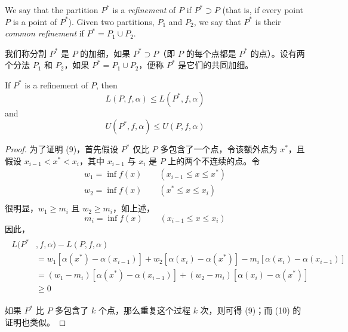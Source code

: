 \documentclass[../poma-notes.tex]{subfiles}
\begin{document}
\newpage

\begin{definition}
  We say that the partition $P^*$ is a \textit{refinement} of $P$ if $P^* \supset P$ (that is, if every point $P$ is a
  point of $P^*$). Given two partitions, $P_1$ and $P_2$, we say that $P^*$ is their \textit{common refinement} if
  $P^* = P_1 \cup P_2$.
\end{definition}

\begin{anote}
  我们称分割 $P^*$ 是 $P$ 的加细，如果 $P^* \supset P$（即 $P$ 的每个点都是 $P^*$ 的点）。设有两个分法 $P_1$ 和 $P_2$，如果
  $P^* = P_1 \cup P_2$，便称 $P^*$ 是它们的共同加细。
\end{anote}

\begin{theorem}
  If $P^*$ is a refinement of $P$, then
  \begin{equation}
    L(P, f, \alpha) \le L(P^*, f, \alpha)
  \end{equation}
  and
  \begin{equation}
    U(P^*, f, \alpha) \le U(P, f, \alpha)
  \end{equation}
\end{theorem}

\begin{proof}
  为了证明 (9)，首先假设 $P^*$ 仅比 $P$ 多包含了一个点，令该额外点为 $x^*$，且假设 $x_{i-1} < x^* < x_i$，其中 $x_{i-1}$ 与 $x_i$ 是
  $P$ 上的两个不连续的点。令
  \begin{gather*}
    w_1 = \inf f(x) \qquad (x_{i-1} \le x \le x^*) \\
    w_2 = \inf f(x) \qquad (x^* \le x \le x_i) \\
  \end{gather*}
  很明显，$w_1 \ge m_i$ 且 $w_2 \ge m_i$，如上述，
  \[
    m_i = \inf f(x) \qquad (x_{i-1} \le x \le x_i)
  \]
  因此，
  \begin{align*}
    \begin{split}
      L(P^* &, f, \alpha) - L(P, f, \alpha) \\
      &= w_1[\alpha(x^*) - \alpha(x_{i-1})] + w_2[\alpha(x_i) - \alpha(x^*)] - m_i [\alpha(x_i) - \alpha(x_{i-1})] \\
      &= (w_1 - m_i)[\alpha(x^*) - \alpha(x_{i-1})] + (w_2 - m_i)[\alpha(x_i) - \alpha(x^*)] \\
      &\ge 0
    \end{split}
  \end{align*}

  如果 $P^*$ 比 $P$ 多包含了 $k$ 个点，那么重复这个过程 $k$ 次，则可得 (9)；而 (10) 的证明也类似。
\end{proof}
\end{document}
